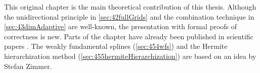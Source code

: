 This original chapter is the main theoretical contribution of this thesis.
Although the unidirectional principle in \cref{sec:42fullGrids} and
the combination technique in \cref{sec:43dimAdaptive} are well-known,
the presentation with formal proofs of correctness is new.
Parts of the chapter have already been published in scientific papers
\cite{Valentin18Fundamental}.
The weakly fundamental splines (\cref{sec:454wfs}) and the
Hermite hierarchization method (\cref{sec:455hermiteHierarchization})
are based on an idea by Stefan Zimmer.









\cleardoublepage
